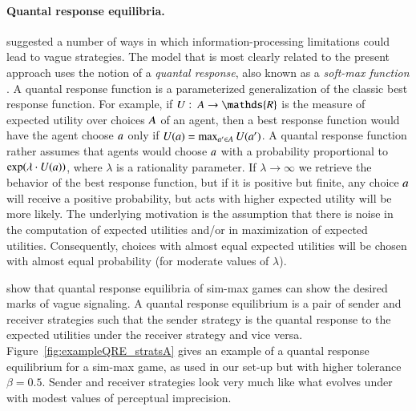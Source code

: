 \documentclass[fleqn,reqno,10pt]{article}
\newcommand{\rdd}{\acro{rdd}} %
\newcommand{\toler}{\ensuremath{\beta}} %
\begin{document}
\paragraph{Quantal response equilibria.}
\citet{FrankeJager2010:Vagueness-Signa} suggested a number of ways in
which information-processing limitations could lead to vague
strategies. The model that is most clearly related to the present
approach uses the notion of a \emph{quantal response}, also known as a
\emph{soft-max function}
\citep[e.g.][]{Luce1959:Individual-Choi,McFadden1976:Quantal-Choice-,GoereeHolt2008:Quantal-Respons}. A
quantal response function is a parameterized generalization of the
classic best response function. For example, if $U \mycolon \Acts
\rightarrow \mathds{R}$ is the measure of expected utility over
choices $A$ of an agent, then a best response function would have
the agent choose $a$ only if $U(a) = \max_{a^\prime \in A}
U(a^\prime)$. A quantal response function rather assumes that agents would
choose $a$ with a probability proportional to $\operatorname{exp}(\lambda \cdot
U(a))$, where $\lambda$ is a rationality parameter. If $\lambda
\rightarrow \infty$ we retrieve the behavior of the best response
function, but if it is positive but finite, any choice $a$ will
receive a positive probability, but acts with higher expected utility
will be more likely. The underlying motivation is the assumption that
there is noise in the computation of expected utilities and/or in
maximization of expected utilities. Consequently, choices with almost
equal expected utilities will be chosen with almost equal probability
(for moderate values of $\lambda$).

\citet{FrankeJager2010:Vagueness-Signa} show that quantal response
equilibria of sim-max games can show the desired marks of vague
signaling. A quantal response equilibrium is a pair of sender and
receiver strategies such that the sender strategy is the quantal
response to the expected utilities under the receiver strategy and
vice versa. Figure~\ref{fig:exampleQRE_stratsA} gives an example of a
quantal response equilibrium for a sim-max game, as used in our set-up
but with higher tolerance $\toler = 0.5$. Sender and receiver
strategies look very much like what evolves under \rdd with modest
values of perceptual imprecision.
\end{document}
